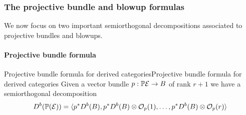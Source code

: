 
\subsubsection{The projective bundle and blowup formulas}
We now focus on two important semiorthogonal decompositions associated to projective bundles and blowups.

\paragraph*{Projective bundle formula}
\begin{proposition}{Projective bundle formula for derived categories}{Projective bundle formula for derived categories}
    Given a vector bundle $p:\mathbb{P}\mathcal{E}\to B$ of rank $r+1$ we have a semiorthogonal decomposition
    \begin{equation*}
        D^b(\mathbb{P}(\mathcal{E})) = \langle p^*D^b(B),p^*D^b(B)\otimes\mathcal{O}_p(1),\ldots,p^*D^b(B)\otimes\mathcal{O}_p(r)\rangle
    \end{equation*} 
\end{proposition}


